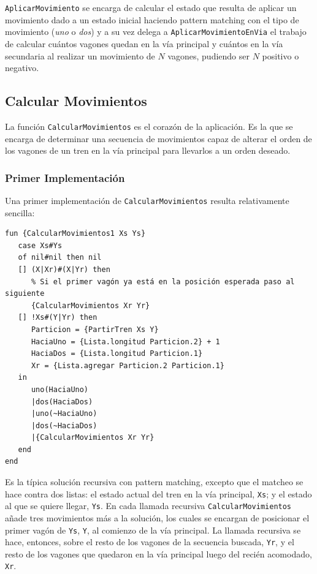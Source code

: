 \documentclass[12pt,titlepage]{article}
\begin{document}
\lstinline|AplicarMovimiento| se encarga de calcular el estado que resulta de aplicar un movimiento dado a un estado inicial haciendo pattern matching con el tipo de movimiento (\emph{uno} o \emph{dos}) y a su vez delega a \lstinline|AplicarMovimientoEnVia| el trabajo de calcular cuántos vagones quedan en la vía principal y cuántos en la vía secundaria al realizar un movimiento de $N$ vagones, pudiendo ser $N$ positivo o negativo.

\subsection{Calcular Movimientos}

La función \lstinline|CalcularMovimientos| es el corazón de la aplicación. Es la que se encarga de determinar una secuencia de movimientos capaz de alterar el orden de los vagones de un tren en la vía principal para llevarlos a un orden deseado.

\subsubsection{Primer Implementación}

Una primer implementación de \lstinline|CalcularMovimientos| resulta relativamente sencilla:
\begin{lstlisting}[basicstyle=\ttfamily\footnotesize,label=lst:calcularmovimientosv1]
% Primer versión de CalcularMovimientos. No comprime.
fun {CalcularMovimientos1 Xs Ys}
   case Xs#Ys 
   of nil#nil then nil
   [] (X|Xr)#(X|Yr) then
      % Si el primer vagón ya está en la posición esperada paso al siguiente
      {CalcularMovimientos Xr Yr}
   [] !Xs#(Y|Yr) then 
      Particion = {PartirTren Xs Y}
      HaciaUno = {Lista.longitud Particion.2} + 1
      HaciaDos = {Lista.longitud Particion.1}
      Xr = {Lista.agregar Particion.2 Particion.1}
   in
      uno(HaciaUno)
      |dos(HaciaDos)
      |uno(~HaciaUno)
      |dos(~HaciaDos)
      |{CalcularMovimientos Xr Yr}
   end
end
\end{lstlisting}

Es la típica solución recursiva con pattern matching, excepto que el matcheo se hace contra dos listas: el estado actual del tren en la vía principal, \lstinline$Xs$; y el estado al que se quiere llegar, \lstinline$Ys$. En cada llamada recursiva \lstinline|CalcularMovimientos| añade tres movimientos más a la solución, los cuales se encargan de posicionar el primer vagón de \lstinline$Ys$, \lstinline$Y$, al comienzo de la vía principal. La llamada recursiva se hace, entonces, sobre el resto de los vagones de la secuencia buscada, \lstinline$Yr$, y el resto de los vagones que quedaron en la vía principal luego del recién acomodado, \lstinline$Xr$.
\end{document}
